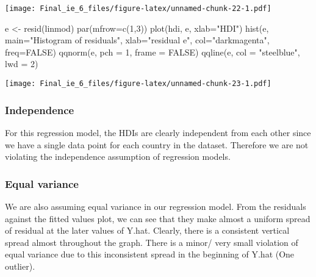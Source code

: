\documentclass[
  12pt,
]{article}
\newenvironment{Shaded}{\begin{snugshade}}{\end{snugshade}}
\newcommand{\AttributeTok}[1]{\textcolor[rgb]{0.77,0.63,0.00}{#1}}
\newcommand{\ConstantTok}[1]{\textcolor[rgb]{0.00,0.00,0.00}{#1}}
\newcommand{\DecValTok}[1]{\textcolor[rgb]{0.00,0.00,0.81}{#1}}
\newcommand{\FunctionTok}[1]{\textcolor[rgb]{0.00,0.00,0.00}{#1}}
\newcommand{\NormalTok}[1]{#1}
\newcommand{\OtherTok}[1]{\textcolor[rgb]{0.56,0.35,0.01}{#1}}
\newcommand{\StringTok}[1]{\textcolor[rgb]{0.31,0.60,0.02}{#1}}
\begin{document}
\texttt{[image: Final\_ie\_6\_files/figure-latex/unnamed-chunk-22-1.pdf]}

\begin{Shaded}
\begin{Highlighting}[]
\NormalTok{e }\OtherTok{\textless{}{-}} \FunctionTok{resid}\NormalTok{(linmod)}
\FunctionTok{par}\NormalTok{(}\AttributeTok{mfrow=}\FunctionTok{c}\NormalTok{(}\DecValTok{1}\NormalTok{,}\DecValTok{3}\NormalTok{))}
\FunctionTok{plot}\NormalTok{(hdi, e, }\AttributeTok{xlab=}\StringTok{"HDI"}\NormalTok{)}
\FunctionTok{hist}\NormalTok{(e, }\AttributeTok{main=}\StringTok{"Histogram of residuals"}\NormalTok{, }\AttributeTok{xlab=}\StringTok{"residual e"}\NormalTok{, }\AttributeTok{col=}\StringTok{"darkmagenta"}\NormalTok{, }\AttributeTok{freq=}\ConstantTok{FALSE}\NormalTok{)}
\FunctionTok{qqnorm}\NormalTok{(e, }\AttributeTok{pch =} \DecValTok{1}\NormalTok{, }\AttributeTok{frame =} \ConstantTok{FALSE}\NormalTok{)}
\FunctionTok{qqline}\NormalTok{(e, }\AttributeTok{col =} \StringTok{"steelblue"}\NormalTok{, }\AttributeTok{lwd =} \DecValTok{2}\NormalTok{)}
\end{Highlighting}
\end{Shaded}

\texttt{[image: Final\_ie\_6\_files/figure-latex/unnamed-chunk-23-1.pdf]}

\hypertarget{independence}{%
\subsubsection{Independence}\label{independence}}

For this regression model, the HDIs are clearly independent from each
other since we have a single data point for each country in the dataset.
Therefore we are not violating the independence assumption of regression
models.

\hypertarget{equal-variance}{%
\subsubsection{Equal variance}\label{equal-variance}}

We are also assuming equal variance in our regression model. From the
residuals against the fitted values plot, we can see that they make
almost a uniform spread of residual at the later values of Y.hat.
Clearly, there is a consistent vertical spread almost throughout the
graph. There is a minor/ very small violation of equal variance due to
this inconsistent spread in the beginning of Y.hat (One outlier).
\end{document}
